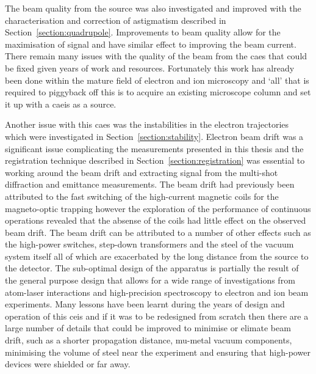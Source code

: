 The beam quality from the source was also investigated and improved with the characterisation and correction of astigmatism described in Section~\ref{section:quadrupole}.
Improvements to beam quality allow for the maximisation of signal and have similar effect to improving the beam current.
There remain many issues with the quality of the beam from the \gls{caes} that could be fixed given years of work and resources.
Fortunately this work has already been done within the mature field of electron and ion microscopy and `all' that is required to piggyback off this is to acquire an existing microscope column and set it up with a \gls{caeis} as a source.

Another issue with this \gls{caes} was the instabilities in the electron trajectories which were investigated in Section~\ref{section:stability}.
Electron beam drift was a significant issue complicating the measurements presented in this thesis and the registration technique described in Section~\ref{section:registration} was essential to working around the beam drift and extracting signal from the multi-shot diffraction and emittance measurements.
The beam drift had previously been attributed to the fast switching of the high-current magnetic coils for the magneto-optic trapping however the exploration of the performance of continuous operations revealed that the absense of the coils had little effect on the observed beam drift.
The beam drift can be attributed to a number of other effects such as the high-power switches, step-down transformers and the steel of the vacuum system itself all of which are exacerbated by the long distance from the source to the detector.
The sub-optimal design of the apparatus is partially the result of the general purpose design that allows for a wide range of investigations from atom-laser interactions and high-precision spectroscopy to electron and ion beam experiments.
Many lessons have been learnt during the years of design and operation of this \gls{ceis} and if it was to be redesigned from scratch then there are a large number of details that could be improved to minimise or elimate beam drift, such as a shorter propagation distance, mu-metal vacuum components, minimising the volume of steel near the experiment and ensuring that high-power devices were shielded or far away.

